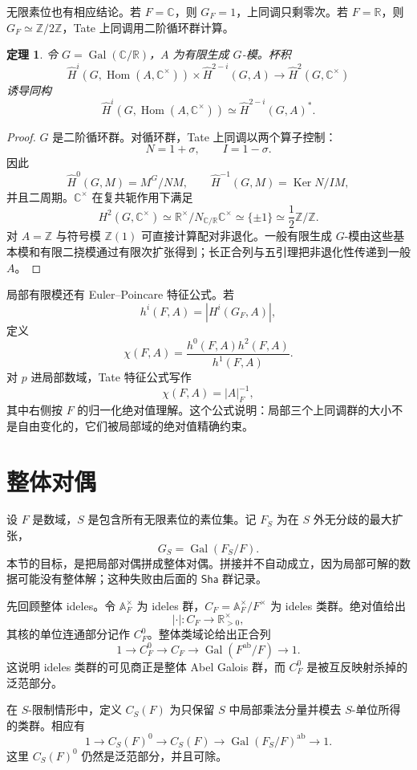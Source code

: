 \documentclass[11pt,a4paper,openany]{ctexbook}
\numberwithin{equation}{chapter}
\newcommand{\R}{\mathbb{R}}
\newcommand{\C}{\mathbb{C}}
\newcommand{\Z}{\mathbb{Z}}
\newcommand{\A}{\mathbb{A}}
\newcommand{\Gal}{\operatorname{Gal}}
\newcommand{\Hom}{\operatorname{Hom}}
\newcommand{\Ker}{\operatorname{Ker}}
\newcommand{\Sha}{\mathsf{Sha}}
\theoremstyle{plain}
\newtheorem{theorem}{定理}[chapter]
\theoremstyle{definition}
\theoremstyle{remark}
\begin{document}
无限素位也有相应结论。若 $F=\C$，则 $G_F=1$，上同调只剩零次。若 $F=\R$，则 $G_F\simeq \Z/2\Z$，Tate 上同调用二阶循环群计算。

\begin{theorem}
令 $G=\Gal(\C/\R)$，$A$ 为有限生成 $G$-模。杯积
\[
\widehat H^i(G,\Hom(A,\C^\times))\times
\widehat H^{2-i}(G,A)\longrightarrow \widehat H^2(G,\C^\times)
\]
诱导同构
\[
\widehat H^i(G,\Hom(A,\C^\times))\simeq
\widehat H^{2-i}(G,A)^*.
\]
\end{theorem}

\begin{proof}
$G$ 是二阶循环群。对循环群，Tate 上同调以两个算子控制：
\[
N=1+\sigma,\qquad I=1-\sigma.
\]
因此
\[
\widehat H^0(G,M)=M^G/NM,\qquad
\widehat H^{-1}(G,M)=\Ker N/IM,
\]
并且二周期。$\C^\times$ 在复共轭作用下满足
\[
H^2(G,\C^\times)\simeq \R^\times/N_{\C/\R}\C^\times\simeq \{\pm1\}\simeq \frac12\Z/\Z.
\]
对 $A=\Z$ 与符号模 $\Z(1)$ 可直接计算配对非退化。一般有限生成 $G$-模由这些基本模和有限二挠模通过有限次扩张得到；长正合列与五引理把非退化性传递到一般 $A$。
\end{proof}

局部有限模还有 Euler--Poincare 特征公式。若
\[
h^i(F,A)=|H^i(G_F,A)|,
\]
定义
\[
\chi(F,A)=\frac{h^0(F,A)h^2(F,A)}{h^1(F,A)}.
\]
对 $p$ 进局部数域，Tate 特征公式写作
\[
\chi(F,A)=|A|_F^{-1},
\]
其中右侧按 $F$ 的归一化绝对值理解。这个公式说明：局部三个上同调群的大小不是自由变化的，它们被局部域的绝对值精确约束。

\section{整体对偶}

设 $F$ 是数域，$S$ 是包含所有无限素位的素位集。记 $F_S$ 为在 $S$ 外无分歧的最大扩张，
\[
G_S=\Gal(F_S/F).
\]
本节的目标，是把局部对偶拼成整体对偶。拼接并不自动成立，因为局部可解的数据可能没有整体解；这种失败由后面的 $\Sha$ 群记录。

先回顾整体 ideles。令 $\A_F^\times$ 为 ideles 群，$C_F=\A_F^\times/F^\times$ 为 ideles 类群。绝对值给出
\[
|\cdot|:C_F\to \R_{>0}^\times,
\]
其核的单位连通部分记作 $C_F^0$。整体类域论给出正合列
\[
1\to C_F^0\to C_F\longrightarrow \Gal(F^{\mathrm{ab}}/F)\to 1.
\]
这说明 ideles 类群的可见商正是整体 Abel Galois 群，而 $C_F^0$ 是被互反映射杀掉的泛范部分。

在 $S$-限制情形中，定义 $C_S(F)$ 为只保留 $S$ 中局部乘法分量并模去 $S$-单位所得的类群。相应有
\[
1\to C_S(F)^0\to C_S(F)\longrightarrow \Gal(F_S/F)^{\mathrm{ab}}\to 1.
\]
这里 $C_S(F)^0$ 仍然是泛范部分，并且可除。
\end{document}
